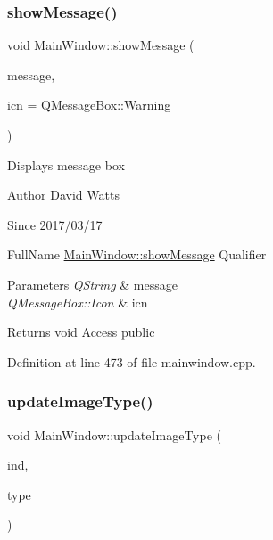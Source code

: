 \subsubsection{\texorpdfstring{show\+Message()}{showMessage()}\hspace{0.1cm}{\footnotesize\ttfamily [2/2]}}
{\footnotesize\ttfamily void Main\+Window\+::show\+Message (\begin{DoxyParamCaption}\item[{Q\+String}]{message,  }\item[{Q\+Message\+Box\+::\+Icon}]{icn = {\ttfamily QMessageBox\+:\+:Warning} }\end{DoxyParamCaption})}

Displays message box

\begin{DoxyAuthor}{Author}
David Watts 
\end{DoxyAuthor}
\begin{DoxySince}{Since}
2017/03/17
\end{DoxySince}
Full\+Name \hyperlink{class_main_window_a280d25148ac076ca817d411372584ae5}{Main\+Window\+::show\+Message} Qualifier 
\begin{DoxyParams}{Parameters}
{\em Q\+String} & message \\
\hline
{\em Q\+Message\+Box\+::\+Icon} & icn \\
\hline
\end{DoxyParams}
\begin{DoxyReturn}{Returns}
void Access public 
\end{DoxyReturn}


Definition at line 473 of file mainwindow.\+cpp.

\mbox{\label{class_main_window_a171b0591a4f66b4b16a33d4af5c35465}} 
\subsubsection{\texorpdfstring{update\+Image\+Type()}{updateImageType()}}
{\footnotesize\ttfamily void Main\+Window\+::update\+Image\+Type (\begin{DoxyParamCaption}\item[{int}]{ind,  }\item[{image\+Type\+::image\+Type}]{type }\end{DoxyParamCaption})}

